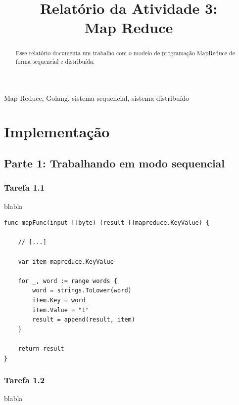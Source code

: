 \documentclass[conference]{IEEEtran}
\begin{document}
\title{Relatório da Atividade 3: \\ Map Reduce\\
}

\author{
}

\maketitle

\begin{abstract}
Esse relatório documenta um trabalho com o modelo de programação MapReduce de forma sequencial e distribuída.
\end{abstract}

\begin{IEEEkeywords}
Map Reduce, Golang, sistema sequencial, sistema distribuído
\end{IEEEkeywords}

\section{Implementação}

\subsection{Parte 1: Trabalhando em modo sequencial}

\subsubsection{Tarefa 1.1} blabla

\begin{lstlisting}
func mapFunc(input []byte) (result []mapreduce.KeyValue) {

	// [...]

	var item mapreduce.KeyValue

	for _, word := range words {
		word = strings.ToLower(word)
		item.Key = word
		item.Value = "1"
		result = append(result, item)
	}
	
	return result
}
\end{lstlisting}

\subsubsection{Tarefa 1.2} blabla
\end{document}
